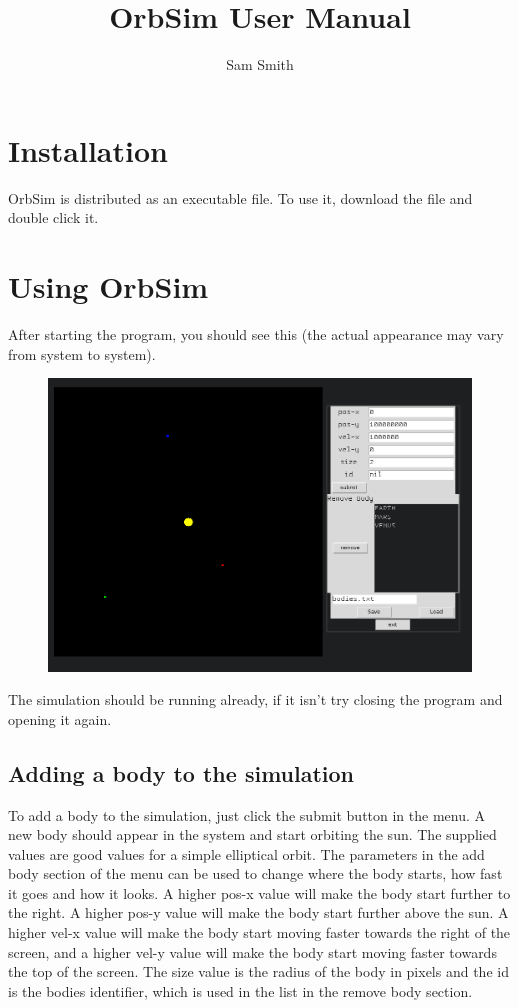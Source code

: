 \documentclass[a4paper,11pt,titlepage]{article}
\author{Sam Smith}
\title{OrbSim User Manual}
\date{ }
\begin{document}
\maketitle
\tableofcontents
\clearpage

\section{Installation}
OrbSim is distributed as an executable file. To use it, download the file and
double click it.

\section{Using OrbSim}

After starting the program, you should see this (the actual appearance may vary
from system to system).
\begin{figure}[H]
	\includegraphics[width=\textwidth]{../img/start.png}
\end{figure}

The simulation should be running already, if it isn't try closing the program
and opening it again.

\subsection{Adding a body to the simulation}
To add a body to the simulation, just click the submit button in the menu. A new
body should appear in the system and start  orbiting the sun. The supplied
values are good values for a simple elliptical orbit. The parameters in the add
body section of the menu can be used to change where the body starts, how fast
it goes and how it looks. A higher pos-x value will make the body start further
to the right. A higher pos-y value will make the body start further above the
sun. A higher vel-x value will make the body start moving faster towards the
right of the screen, and a higher vel-y value will make the body start moving
faster towards the top of the screen. The size value is the radius of the body
in pixels and the id is the bodies identifier, which is used in the list in the
remove body section.
\end{document}
